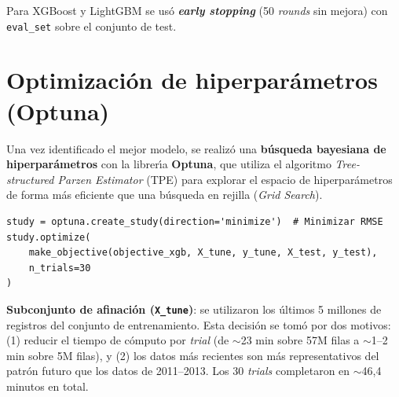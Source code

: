 \documentclass[12pt, a4paper, oneside]{report}
\newcommand{\code}[1]{\texttt{\small\color{codeblue}#1}}
\begin{document}
Para XGBoost y LightGBM se us\'o \textbf{\textit{early stopping}} (50 \textit{rounds} sin mejora) con \code{eval\_set} sobre el conjunto de test.

\section{Optimizaci\'on de hiperpar\'ametros (Optuna)}

Una vez identificado el mejor modelo, se realiz\'o una \textbf{b\'usqueda bayesiana de hiperpar\'ametros} con la librer\'{\i}a \textbf{Optuna}, que utiliza el algoritmo \textit{Tree-structured Parzen Estimator} (TPE) para explorar el espacio de hiperpar\'ametros de forma m\'as eficiente que una b\'usqueda en rejilla (\textit{Grid Search}).

\begin{lstlisting}[caption={Configuraci\'on del estudio Optuna}, label={lst:optuna}]
study = optuna.create_study(direction='minimize')  # Minimizar RMSE
study.optimize(
    make_objective(objective_xgb, X_tune, y_tune, X_test, y_test),
    n_trials=30
)
\end{lstlisting}

\textbf{Subconjunto de afinaci\'on (\code{X\_tune})}: se utilizaron los \'ultimos 5 millones de registros del conjunto de entrenamiento. Esta decisi\'on se tom\'o por dos motivos: (1) reducir el tiempo de c\'omputo por \textit{trial} (de $\sim$23 min sobre 57M filas a $\sim$1--2 min sobre 5M filas), y (2) los datos m\'as recientes son m\'as representativos del patr\'on futuro que los datos de 2011--2013. Los 30 \textit{trials} completaron en $\sim$46,4 minutos en total.
\end{document}
